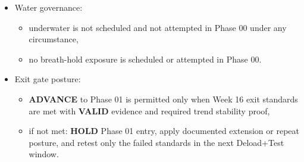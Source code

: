\documentclass[10pt]{article}
\begin{document}
\begin{itemize}
\item Water governance:
  \begin{itemize}
  \item underwater is not scheduled and not attempted in Phase 00 under any circumstance,
  \item no breath-hold exposure is scheduled or attempted in Phase 00.
  \end{itemize}

\item Exit gate posture:
  \begin{itemize}
  \item \textbf{ADVANCE} to Phase 01 is permitted only when Week 16 exit standards are met with \textbf{VALID} evidence and required trend stability proof,
  \item if not met: \textbf{HOLD} Phase 01 entry, apply documented extension or repeat posture, and retest only the failed standards in the next Deload+Test window.
  \end{itemize}
\end{itemize}
\end{document}

